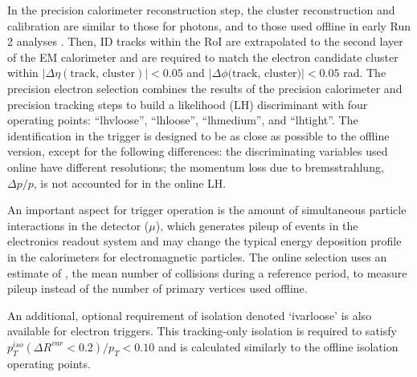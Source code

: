 In the precision calorimeter reconstruction step, the cluster reconstruction and calibration are similar to those for photons, and to those used offline in early Run 2 analyses \cite{PERF-2017-01}. Then, ID tracks within the
RoI are extrapolated to the second layer of the EM calorimeter and are required to match the electron candidate cluster within $|\Delta\eta(\text{track, cluster})| < 0.05$ and $|\Delta\phi\text{(track, cluster)}| < 0.05$ rad.
The precision electron selection combines the results of the precision calorimeter and precision tracking steps to build a likelihood (LH) discriminant with four operating points: ``lhvloose'', ``lhloose'', ``lhmedium'', and ``lhtight''. The identification in the trigger is designed to be as close as possible to the offline version, except for the following differences: 
the discriminating variables used online have different resolutions; 
the momentum loss due to bremsstrahlung, $\Delta p/p$, is not accounted for in the online LH.  

An important aspect for trigger operation is the amount of simultaneous particle interactions in the detector ($\mu$), which generates pileup of events in the electronics readout system and may change the typical energy deposition profile in the calorimeters for electromagnetic particles. The online selection uses an estimate of \avgmu{}, the mean number of collisions during a reference period, to measure pileup instead of the number of primary vertices used offline. %


An additional, optional requirement of isolation denoted ‘ivarloose’ is also available for electron triggers. This tracking-only isolation is required to satisfy 
$p_T^{iso}(\Delta R^{var}<0.2)/p_T < 0.10$ and is calculated similarly to the offline isolation operating points.

